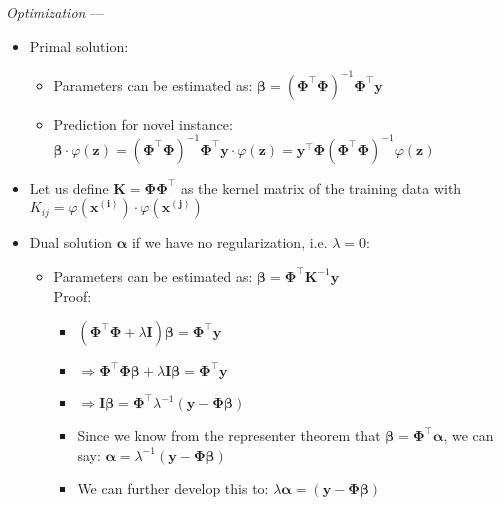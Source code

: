 \emph{Optimization} ---
\begin{itemize}
    \item Primal solution:
    \begin{itemize}
        \item Parameters can be estimated as: $\boldsymbol{\beta} = (\boldsymbol{\Phi}^\intercal \boldsymbol{\Phi})^{-1}  \boldsymbol{\Phi}^\intercal \boldsymbol{y}$
        \item Prediction for novel instance: $\boldsymbol{\beta} \cdot \varphi({\boldsymbol{z}}) = (\boldsymbol{\Phi}^\intercal \boldsymbol{\Phi})^{-1}  \boldsymbol{\Phi}^\intercal \boldsymbol{y} \cdot \varphi({\boldsymbol{z}}) = \boldsymbol{y}^\intercal \boldsymbol{\Phi} (\boldsymbol{\Phi}^\intercal \boldsymbol{\Phi})^{-1} \varphi({\boldsymbol{z}}) $
    \end{itemize}
    \item Let us define $\boldsymbol{K} = \boldsymbol{\Phi} \boldsymbol{\Phi}^\intercal$ as the kernel matrix of the training data with $K_{ij} = \varphi(\boldsymbol{x^{(i)}}) \cdot \varphi(\boldsymbol{x^{(j)}})$
    \item Dual solution $\boldsymbol{\alpha}$ if we have no regularization, i.e. $\lambda = 0$:
    \begin{itemize}
        \item Parameters can be estimated as: $\boldsymbol{\beta} =  \boldsymbol{\Phi}^\intercal \boldsymbol{K}^{-1} \boldsymbol{y}$\\
        Proof:
        \begin{itemize}
            \item $(\boldsymbol{\Phi}^\intercal \boldsymbol{\Phi} + \lambda \boldsymbol{I}) \boldsymbol{\beta} = \boldsymbol{\Phi}^\intercal \boldsymbol{y}$
            \item $\Rightarrow \boldsymbol{\Phi}^\intercal \boldsymbol{\Phi} \boldsymbol{\beta} + \lambda \boldsymbol{I} \boldsymbol{\beta} = \boldsymbol{\Phi}^\intercal \boldsymbol{y}$
            \item $\Rightarrow \boldsymbol{I} \boldsymbol{\beta} = \boldsymbol{\Phi}^\intercal \lambda^{-1}  (\boldsymbol{y} - \boldsymbol{\Phi} \boldsymbol{\beta})$
            \item Since we know from the representer theorem that $\boldsymbol{\beta} = \boldsymbol{\Phi}^\intercal \boldsymbol{\alpha}$, we can say: $\boldsymbol{\alpha} = \lambda^{-1}  (\boldsymbol{y} - \boldsymbol{\Phi} \boldsymbol{\beta})$ 
            \item We can further develop this to: $\lambda \boldsymbol{\alpha} = (\boldsymbol{y} - \boldsymbol{\Phi} \boldsymbol{\beta})$

\end{itemize}
\end{itemize}
\end{itemize}
